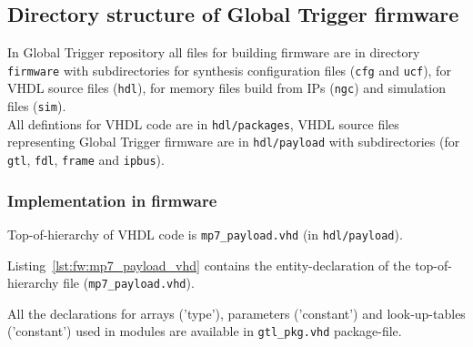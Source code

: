 \subsection{Directory structure of Global Trigger firmware} \label{sec:fw:dir_struct_gt_fw}

In Global Trigger repository all files for building firmware are in directory \texttt{firmware} with subdirectories for synthesis configuration files (\texttt{cfg} and \texttt{ucf}), for VHDL source files (\texttt{hdl}), for memory files build from IPs (\texttt{ngc}) and simulation files (\texttt{sim}).\\
All defintions for VHDL code are in \texttt{hdl/packages}, VHDL source files representing Global Trigger firmware are in \texttt{hdl/payload} with subdirectories (for \texttt{gtl}, \texttt{fdl}, \texttt{frame} and \texttt{ipbus}).

\subsubsection{Implementation in firmware}
\label{sec:fw:implementation_firmware}

Top-of-hierarchy of VHDL code is \texttt{mp7\_payload.vhd} (in \texttt{hdl/payload}).

Listing~\ref{lst:fw:mp7_payload_vhd} contains the entity-declaration of the top-of-hierarchy file (\texttt{mp7\_payload.vhd}).



All the declarations for arrays ('type'), parameters ('constant') and look-up-tables ('constant') used in modules are available in \texttt{gtl\_pkg.vhd} package-file.

